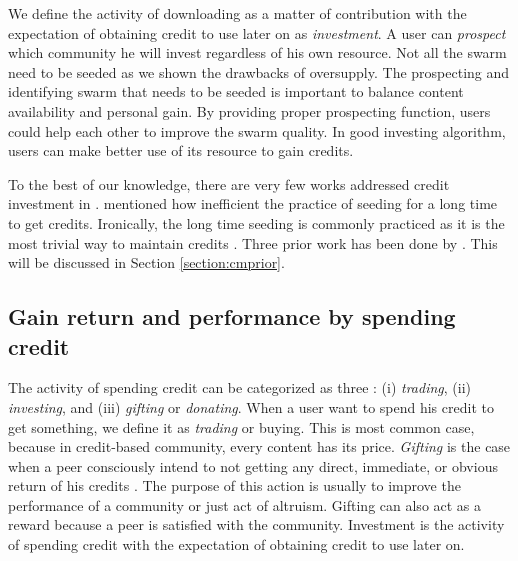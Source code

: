 We define the activity of downloading as a matter of contribution with the expectation of obtaining credit to use later on as \textit{investment}. A user can \textit{prospect} which community he will invest regardless of his own resource. Not all the swarm need to be seeded as we shown the drawbacks of oversupply. The prospecting and identifying swarm that needs to be seeded is important to balance content availability and personal gain. By providing proper prospecting function, users could help each other to improve the swarm quality. In good investing algorithm, users can make better use of its resource to gain credits.

To the best of our knowledge, there are very few works addressed credit investment in \bt. \citeauthor{2013:survivepriv:jia} mentioned how inefficient the practice of seeding for a long time to get credits. Ironically, the long time seeding is commonly practiced as it is the most trivial way to maintain credits \cite{2013:survivepriv:jia}. Three prior work has been done by \citeauthor{2015:creditmining:capota} \cite{2015:creditmining:capota, 2013:investmentcm:capota, 2014:bwmarket:capota}. This will be discussed in Section \ref{section:cmprior}. 

\subsection{Gain return and performance by spending credit}
The activity of spending credit can be categorized as three : (i) \textit{trading}, (ii) \textit{investing}, and (iii) \textit{gifting} or \textit{donating}. When a user want to spend his credit to get something, we define it as \textit{trading} or buying. This is most common case, because in credit-based community, every content has its price. \textit{Gifting} is the case when a peer consciously intend to not getting any direct, immediate, or obvious return of his credits \cite{2006:gifting:ripeanu}. The purpose of this action is usually to improve the performance of a community or just act of altruism. Gifting can also act as a reward because a peer is satisfied with the community. Investment is the activity of spending credit with the expectation of obtaining credit to use later on. 

